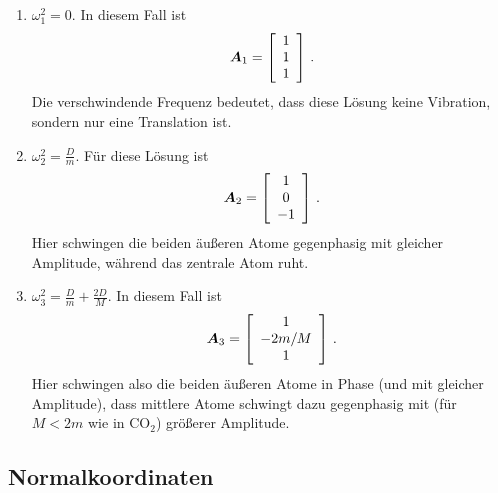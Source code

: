 \documentclass[paper=a4, fontsize=11.0pt, abstractoff, DIV12]{scrartcl}
\begin{document}
\begin{enumerate}
    \item $\omega_1^2 = 0$. In diesem Fall ist
        \begin{equation}
            {\ensuremath{\boldsymbol{A}}}_1 = \left[ \begin{array}{c} 1 \\ 1 \\ 1 \end{array} \right]\,.
        \end{equation}
        Die verschwindende Frequenz bedeutet, dass diese Lösung keine Vibration,
        sondern nur eine Translation ist.
    \item $\omega_2^2 = \frac{D}{m}$. Für diese Lösung ist
     \begin{equation}
            {\ensuremath{\boldsymbol{A}}}_2 = \left[ \begin{array}{c} 1 \\ 0 \\ -1 \end{array} \right]\,.
        \end{equation}
     Hier schwingen die beiden äußeren Atome gegenphasig mit gleicher
     Amplitude, während das zentrale Atom ruht.
    \item $\omega_3^2 = \frac{D}{m}+\frac{2D}{M}$. In diesem Fall ist
        \begin{equation}
            {\ensuremath{\boldsymbol{A}}}_3 = \left[ \begin{array}{c} 1 \\ -2m/M \\ 1 \end{array} \right]\,.
        \end{equation}
        Hier schwingen also die beiden äußeren Atome in Phase (und mit
        gleicher Amplitude), dass mittlere Atome schwingt dazu gegenphasig
        mit (für $M < 2m$ wie in $\mathrm{CO}_2$) größerer Amplitude.
\end{enumerate}

\subsection{Normalkoordinaten}
\end{document}
